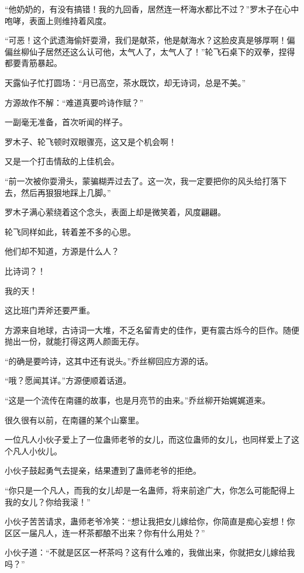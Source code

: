 
\begin{this_body}

“他奶奶的，有没有搞错！我的九回香，居然连一杯海水都比不过？”罗木子在心中咆哮，表面上则维持着风度。

“可恶！这个武遗海偷奸耍滑，我们是献茶，他是献海水？这脸皮真是够厚啊！偏偏丝柳仙子居然还这么认可他，太气人了，太气人了！”轮飞石桌下的双拳，捏得都要青筋暴起。

天露仙子忙打圆场：“月已高空，茶水既饮，却无诗词，总是不美。”

方源故作不解：“难道真要吟诗作赋？”

一副毫无准备，首次听闻的样子。

罗木子、轮飞顿时双眼骤亮，这又是个机会啊！

又是一个打击情敌的上佳机会。

“前一次被你耍滑头，蒙骗糊弄过去了。这一次，我一定要把你的风头给打落下去，然后再狠狠地踩上几脚。”

罗木子满心萦绕着这个念头，表面上却是微笑着，风度翩翩。

轮飞同样如此，转着差不多的心思。

他们却不知道，方源是什么人？

比诗词？！

我的天！

这比班门弄斧还要严重。

方源来自地球，古诗词一大堆，不乏名留青史的佳作，更有震古烁今的巨作。随便抛出一份，就能打得这两人颜面无存。

“的确是要吟诗，这其中还有说头。”乔丝柳回应方源的话。

“哦？愿闻其详。”方源便顺着话道。

“这是一个流传在南疆的故事，也是月亮节的由来。”乔丝柳开始娓娓道来。

很久很有以前，在南疆的某个山寨里。

一位凡人小伙子爱上了一位蛊师老爷的女儿，而这位蛊师的女儿，也同样爱上了这个凡人小伙儿。

小伙子鼓起勇气去提亲，结果遭到了蛊师老爷的拒绝。

“你只是一个凡人，而我的女儿却是一名蛊师，将来前途广大，你怎么可能配得上我的女儿？你给我滚！”

小伙子苦苦请求，蛊师老爷冷笑：“想让我把女儿嫁给你，你简直是痴心妄想！你区区一届凡人，连一杯茶都酿不出来？你有什么用处？”

小伙子道：“不就是区区一杯茶吗？这有什么难的，我做出来，你就把女儿嫁给我吗？”


\end{this_body}
